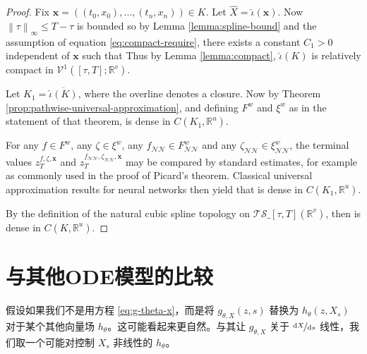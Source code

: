\documentclass{ctexart}
\theoremstyle{plain}
\theoremstyle{definition}
\newcommand{\ts}[2]{\mathcal{T\!S}\_{#1}\left(#2\right)}
\newcommand{\norm}[1]{\left\|#1\right\|}
\newcommand{\reals}{\mathbb{R}}
\newcommand{\ttfrac}[2]{\nicefrac{#1}{#2}}
\begin{document}
\begin{proof}
	Fix $\mathbf{x} = ((t_0, x_0), \ldots, (t_n, x_n)) \in K$. Let $\widehat{X} = \widehat{\iota}(\mathbf{x})$. Now $\norm{\tau}_\infty \leq T-\tau$ is bounded so by Lemma \ref{lemma:spline-bound} and the assumption of equation \eqref{eq:compact-require}, there exists a constant $C_1 > 0$ independent of $\mathbf{x}$ such that
	Thus by Lemma \ref{lemma:compact}, $\widehat{\iota}(K)$ is relatively compact in $\mathcal{V}^1([\tau, T]; \reals^v)$.
	
	Let $K_1 = \overline{\widehat{\iota}(K)}$, where the overline denotes a closure. Now by Theorem \ref{prop:pathwise-universal-approximation}, and defining $F^w$ and $\xi^w$ as in the statement of that theorem,
	is dense in $C(K_1, \reals^u)$.
	
	For any $f \in F^w$, any $\zeta \in \xi^w$, any $f_{\mathcal{N\!N}} \in F^w_{\mathcal{N\!N}}$ and any $\zeta_{\mathcal{N\!N}} \in \xi^w_{\mathcal{N\!N}}$, the terminal values $z_T^{f, \zeta, \mathbf{x}}$ and $z_T^{f_{\mathcal{N\!N}}, \zeta_{\mathcal{N\!N}}, \mathbf{x}}$ may be compared by standard estimates, for example as commonly used in the proof of Picard's theorem. Classical universal approximation results for neural networks \cite{pinkus, deepandnarrow} then yield that
	is dense in $C(K_1, \reals^u)$.
	
	By the definition of the natural cubic spline topology on $\ts{[\tau, T]}{\reals^v}$, then
	is dense in $C(K, \reals^u)$.
\end{proof}
	
	\section{与其他ODE模型的比较}\label{appendix:nonlinear-g}
	假设如果我们不是用方程 \eqref{eq:g-theta-x}，而是将 $g_{\theta, X}(z, s)$ 替换为 $h_{\theta}(z, X_s)$ 对于某个其他向量场 $h_\theta$。这可能看起来更自然。与其让 $g_{\theta, X}$ 关于 $\ttfrac{\mathrm{d}X}{\mathrm{d}s}$ 线性，我们取一个可能对控制 $X_s$ 非线性的 $h_\theta$。
	
\end{document}
